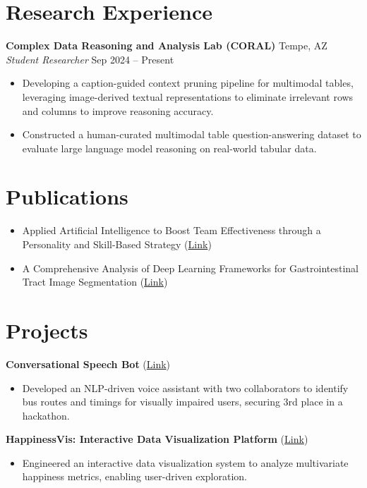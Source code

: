\documentclass[10pt]{article}
\begin{document}
\section*{Research Experience}

\noindent \textbf{Complex Data Reasoning and Analysis Lab (CORAL)} \hfill Tempe, AZ \\
\textit{Student Researcher} \hfill Sep 2024 -- Present
\begin{itemize}
  \item Developing a caption-guided context pruning pipeline for multimodal tables, leveraging image-derived textual representations to eliminate irrelevant rows and columns to improve reasoning accuracy.
  \item Constructed a human-curated multimodal table question-answering dataset to evaluate large language model reasoning on real-world tabular data.
\end{itemize}

\section*{Publications}

\begin{itemize}
  \item Applied Artificial Intelligence to Boost Team Effectiveness through a Personality and Skill-Based Strategy (\href{https://ieeexplore.ieee.org/document/10480783}{Link})
  \item A Comprehensive Analysis of Deep Learning Frameworks for Gastrointestinal Tract Image Segmentation (\href{https://ieeexplore.ieee.org/document/10601740}{Link})
\end{itemize}
\section*{Projects}

\noindent \textbf{Conversational Speech Bot} (\href{https://github.com/prasham1515/Conversational-Speech-bot}{Link})
\begin{itemize}
  \item Developed an NLP-driven voice assistant with two collaborators to identify bus routes and timings for visually impaired users, securing 3rd place in a hackathon.
\end{itemize}

\noindent \textbf{HappinessVis: Interactive Data Visualization Platform} (\href{https://github.com/prasham1515/HappinessVis}{Link})
\begin{itemize}
  \item Engineered an interactive data visualization system to analyze multivariate happiness metrics, enabling user-driven exploration.
\end{itemize}
\end{document}
